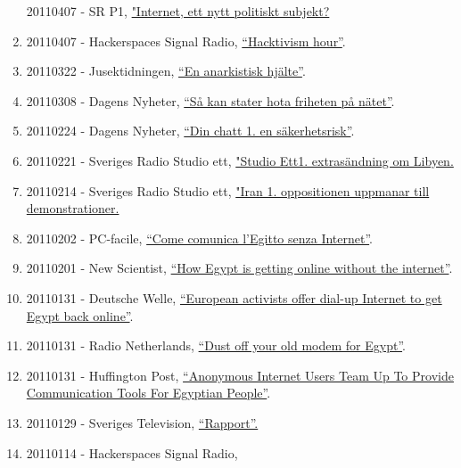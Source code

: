 \documentclass[
]{article}
\begin{document}
\begin{enumerate}
  20110407 - SR P1, \href{http://t.sr.se/PbptWr}{"Internet, ett nytt
  politiskt subjekt?}
\item
  20110407 - Hackerspaces Signal Radio,
  \href{http://signal.hackerspaces.org/archive/2011-04-07-2200-hacktivism-hour.mp3}{``Hacktivism
  hour''}.
\item
  20110322 - Jusektidningen,
  \href{http://www.tidningenkarriar.se/Arkivet/2011/3/Anarkistisk-hjalte/}{``En
  anarkistisk hjälte''}.
\item
  20110308 - Dagens Nyheter,
  \href{http://www.dn.se/vart-internet/vart-internet-hem/sa-kan-stater-hota-friheten-pa-natet/}{``Så
  kan stater hota friheten på nätet''}.
\item
  20110224 - Dagens Nyheter,
  \href{http://www.dn.se/vart-internet/vart-internet-hem/din-chatt-en-sakerhetsrisk/}{``Din
  chatt 1. en säkerhetsrisk''}.
\item
  20110221 - Sveriges Radio Studio ett,
  \href{http://t.sr.se/1cUlHfI}{"Studio Ett1. extrasändning om Libyen.}
\item
  20110214 - Sveriges Radio Studio ett,
  \href{http://t.sr.se/1D1zCXq}{"Iran 1. oppositionen uppmanar till
  demonstrationer.}
\item
  20110202 - PC-facile,
  \href{http://www.pc-facile.com/news/come_comunica_egitto_senza_internet/68959.htm}{``Come
  comunica l'Egitto senza Internet''}.
\item
  20110201 - New Scientist,
  \href{http://www.newscientist.com/blogs/onepercent/2011/02/egypt-remains-officially-offli.html}{``How
  Egypt is getting online without the internet''}.
\item
  20110131 - Deutsche Welle,
  \href{http://www.dw.com/en/european-activists-offer-dial-up-internet-to-get-egypt-back-online/a-14807049}{``European
  activists offer dial-up Internet to get Egypt back online''}.
\item
  20110131 - Radio Netherlands,
  \href{http://www.rnw.nl/english/article/dust-your-dialup-modem-contact-egypt}{``Dust
  off your old modem for Egypt''}.
\item
  20110131 - Huffington Post,
  \href{http://www.huffingtonpost.com/2011/01/29/anonymous-internet-egypt_n_815889.html}{``Anonymous
  Internet Users Team Up To Provide Communication Tools For Egyptian
  People''}.
\item
  20110129 - Sveriges Television,
  \href{http://www.youtube.com/watch?v=HRZ0QKyiFsE\&feature=related}{``Rapport''.}
\item
  20110114 - Hackerspaces Signal Radio,

\end{enumerate}
\end{document}
